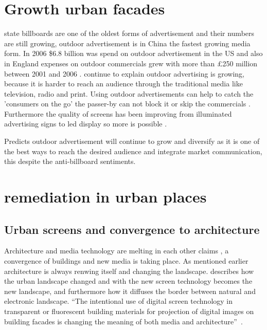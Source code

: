 \documentclass[a4paper, 11pt]{article}
\begin{document}
\section{Growth urban facades} 
\cite{outdoor2009} state billboards are one of the oldest forms of advertisement and their numbers are still growing, outdoor advertisement is in China the fastest growing media form. In 2006 \$6.8 billion was spend on outdoor advertisement in the US and also in England expenses on outdoor commercials grew with more than \pounds 250 million between 2001 and 2006 \citep{outdoor2009}. \cite{outdoor2009} continue to explain outdoor advertising is growing, because it is harder to reach an audience through the traditional media like television, radio and print. Using outdoor advertisements can help to catch the 'consumers on the go' the passer-by can not block it or skip the commercials \citep{outdoor2009}. Furthermore the quality of screens has been improving from illuminated advertising signs to led display so more is possible \citep{outdoor2009}.

\cite{outdoor2009} Predicts outdoor advertisement will continue to grow and diversify as it is one of the best ways to reach the desired audience and integrate market communication, this despite the anti-billboard sentiments.

\section{remediation in urban places}



\subsection{Urban screens and convergence to architecture}


Architecture and media technology are melting in each other claims \cite{Slaatta2006}, a convergence of buildings and new media is taking place. As mentioned earlier architecture is always renwing itself and changing the landscape.\cite{Slaatta2006} describes how the urban landscape changed and with the new screen technology becomes the new landscape, and furthermore how it diffuses the border between natural and electronic landscape. “The intentional use of digital screen technology in transparent or fluorescent building materials for projection of digital images on building facades is changing the meaning of both media and architecture” \citep[P.1]{Slaatta2006}.
\end{document}

